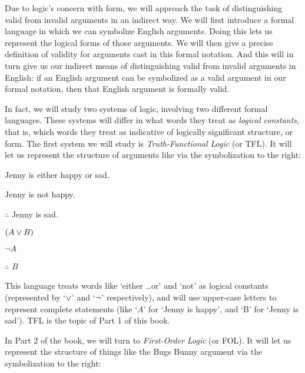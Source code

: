 Due to logic's concern with form, we will approach the task of distinguishing valid from invalid arguments in an indirect way. We will first introduce a formal language in which we can symbolize English arguments.  Doing this lets us represent the logical forms of those arguments.  We will then give a precise definition of validity for arguments cast in this formal notation.  And this will in turn give us our indirect means of distinguishing valid from invalid arguments in English: if an English argument can be symbolized as a valid argument in our formal notation, then that English argument is formally valid.

In fact, we will study two systems of logic, involving two different formal languages. These systems will differ in what words they treat as \emph{logical constants}, that is,  which words they treat as indicative of logically significant structure, or form.  The first system we will study is \emph{Truth-Functional Logic} (or TFL).  It will let us represent the structure of arguments like  via the symbolization to the right:

\begin{multicols}{2}

	\begin{earg}
		\item[\eref{exarg8}] Jenny is either happy or sad.
		\item[] Jenny is not happy.
		\item[] $\therefore$ Jenny is sad.
	\end{earg}

\columnbreak

	\begin{earg}
		\item[] $(A \vee B)$
		\item[] $\neg A$
		\item[] $\therefore$ $B$
	\end{earg}

\end{multicols}

\noindent This language treats words like `either \ldots or' and `not' as logical constants (represented by `$\vee$' and `$\neg$' respectively), and will use upper-case letters to represent complete statements (like `$A$' for `Jenny is happy', and `B' for `Jenny is sad').  TFL is the topic of Part 1 of this book.

In Part 2 of the book, we will turn to \emph{First-Order Logic} (or FOL).  It will let us represent the structure of things like the Bugs Bunny argument via the symbolization to the right:



